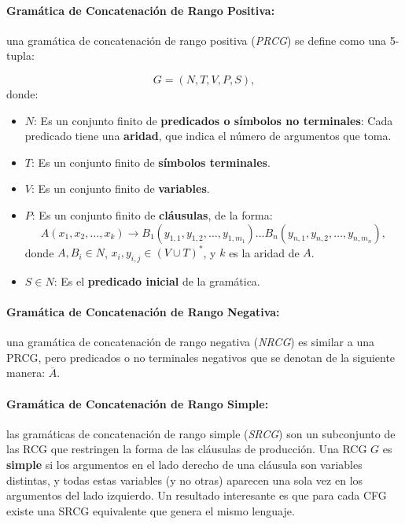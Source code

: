 \documentclass{article}
\begin{document}
\paragraph{Gramática de Concatenación de Rango Positiva:} una gramática de concatenación de rango positiva (\textit{PRCG}) se define como una 5-tupla:

\[
      G = (N, T, V, P, S),
\]
donde:

\begin{itemize}
      \item $N$: Es un conjunto finito de \textbf{predicados o símbolos no terminales}: Cada predicado tiene una \textbf{aridad}, que indica el número de argumentos que toma.
      \item $T$: Es un conjunto finito de \textbf{símbolos terminales}.
      \item $V$: Es un conjunto finito de \textbf{variables}.
      \item $P$: Es un conjunto finito de \textbf{cláusulas}, de la forma:
            \[
                  A(x_1, x_2, \ldots, x_k) \to B_1(y_{1,1}, y_{1,2}, \ldots, y_{1,m_1}) \ldots B_n(y_{n,1}, y_{n,2}, \ldots, y_{n,m_n}),
            \]
            donde $A, B_i \in N$, $x_i, y_{i,j} \in (V \cup T)^*$, y $k$ es la aridad de $A$.
      \item $S \in N$: Es el \textbf{predicado inicial} de la gramática.
\end{itemize}

\paragraph{Gramática de Concatenación de Rango Negativa:} una gramática de concatenación de rango negativa (\textit{NRCG}) es similar a una PRCG, pero predicados o no terminales negativos que se denotan de la siguiente manera: $\overline{A}$.

\paragraph{Gramática de Concatenación de Rango Simple:} las gramáticas de concatenación de rango simple (\textit{SRCG}) son un subconjunto de las RCG que restringen la forma de las cláusulas de producción.
Una RCG $G$ es \textbf{simple} si los argumentos en el lado derecho de una cláusula son variables distintas, y todas estas variables (y no otras) aparecen una sola vez en los argumentos del lado izquierdo.
Un resultado interesante es que para cada CFG existe una SRCG equivalente que genera el mismo lenguaje.
\end{document}
